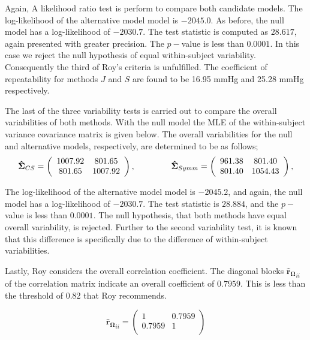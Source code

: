 \documentclass[12pt, a4paper]{article}
\theoremstyle{plain}
\theoremstyle{definition}
\theoremstyle{remark}
\begin{document}
Again, A likelihood ratio test is perform to compare both candidate models. The log-likelihood of the alternative model model is $-2045.0$. As before, the null model has a log-likelihood of $-2030.7$. The test statistic is computed as $28.617$, again presented with greater precision. The $p-$value is less than $0.0001$. In this case we reject the null hypothesis of equal within-subject variability. Consequently the third of Roy's criteria is unfulfilled.
The coefficient of repeatability for methods $J$ and $S$ are found to be 16.95 mmHg and 25.28 mmHg respectively.

The last of the three variability tests is carried out to compare the overall variabilities of both methods.
With the null model the MLE of the within-subject variance covariance matrix is given below. The overall variabilities for the null and alternative models, respectively, are determined to be as follows;
\[
\boldsymbol{\hat{\Sigma}}_{CS} = \left( \begin{array}{cc}
    1007.92  & 801.65  \\
    801.65  & 1007.92  \\
    \end{array}\right),
    \hspace{1.5cm}
\boldsymbol{\hat{\Sigma}}_{Symm} = \left( \begin{array}{cc}
    961.38 & 801.40  \\
    801.40 & 1054.43  \\
    \end{array}\right),
\]

The log-likelihood of the alternative model model is $-2045.2$, and again, the null model has a log-likelihood of $-2030.7$. The test statistic is $28.884$, and the $p-$value is less than $0.0001$. The null hypothesis, that both methods have equal overall variability, is rejected. Further to the second variability test, it is known that this difference is specifically due to the difference of within-subject variabilities.

Lastly, Roy considers the overall correlation coefficient. The diagonal blocks $\boldsymbol{\hat{r}_{\Omega}}_{ii}$ of the correlation matrix indicate an overall coefficient of $0.7959$. This is less than the threshold of 0.82 that Roy recommends.

\[
\boldsymbol{\hat{r}_{\Omega}}_{ii} = \left( \begin{array}{cc}
    1  & 0.7959  \\
    0.7959  & 1  \\
    \end{array}\right)
\]
\end{document}
